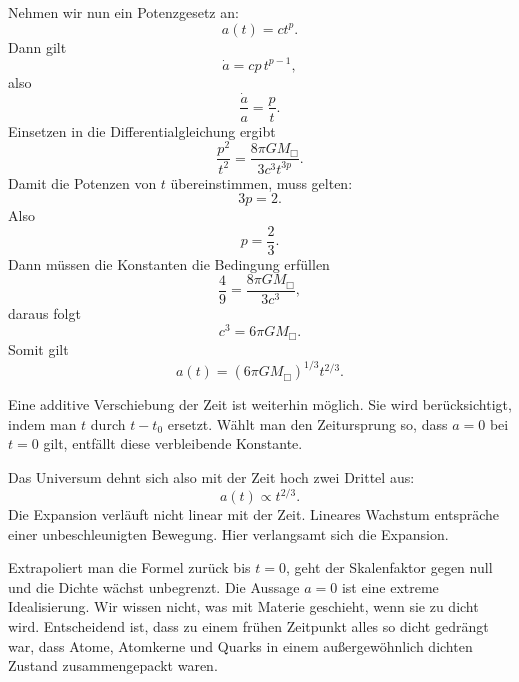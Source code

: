 Nehmen wir nun ein Potenzgesetz an:
\begin{equation}
a(t)=ct^p.
\end{equation}
Dann gilt
\begin{equation}
\dot a = cp\,t^{p-1},
\end{equation}
also
\begin{equation}
\frac{\dot a}{a}=\frac{p}{t}.
\end{equation}
Einsetzen in die Differentialgleichung ergibt
\begin{equation}
\frac{p^2}{t^2}=\frac{8\pi G M_{\Box}}{3c^3t^{3p}}.
\end{equation}
Damit die Potenzen von \(t\) übereinstimmen, muss gelten:
\begin{equation}
3p=2.
\end{equation}
Also
\begin{equation}
p=\frac{2}{3}.
\end{equation}
Dann müssen die Konstanten die Bedingung erfüllen
\begin{equation}
\frac{4}{9}=\frac{8\pi G M_{\Box}}{3c^3},
\end{equation}
daraus folgt
\begin{equation}
c^3=6\pi G M_{\Box}.
\end{equation}
Somit gilt
\begin{equation}
a(t)=\left(6\pi G M_{\Box}\right)^{1/3}t^{2/3}.
\end{equation}

Eine additive Verschiebung der Zeit ist weiterhin möglich. Sie wird berücksichtigt, indem man \(t\) durch \(t-t_0\) ersetzt. Wählt man den Zeitursprung so, dass \(a=0\) bei \(t=0\) gilt, entfällt diese verbleibende Konstante.

Das Universum dehnt sich also mit der Zeit hoch zwei Drittel aus:
\begin{equation}
a(t)\propto t^{2/3}.
\end{equation}
Die Expansion verläuft nicht linear mit der Zeit. Lineares Wachstum entspräche einer unbeschleunigten Bewegung. Hier verlangsamt sich die Expansion.

Extrapoliert man die Formel zurück bis \(t=0\), geht der Skalenfaktor gegen null und die Dichte wächst unbegrenzt. Die Aussage \(a=0\) ist eine extreme Idealisierung. Wir wissen nicht, was mit Materie geschieht, wenn sie zu dicht wird. Entscheidend ist, dass zu einem frühen Zeitpunkt alles so dicht gedrängt war, dass Atome, Atomkerne und Quarks in einem außergewöhnlich dichten Zustand zusammengepackt waren.

